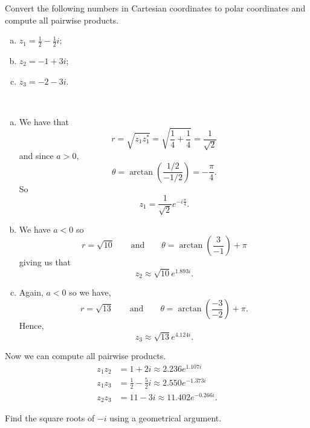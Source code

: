 \documentclass[12pt]{article} %
\begin{document}
\begin{problem}
Convert the following numbers in Cartesian coordinates to polar coordinates and compute all pairwise products.
\begin{enumerate}[(a)]
    \item $z_1=\frac{1}{2}-\frac{1}{2}i$;
    \item $z_2=-1+3i$;
    \item $z_3=-2-3i$.
\end{enumerate}
\end{problem}

\begin{solution}~
\begin{enumerate}[(a)]
    \item We have that
    \[
    r=\sqrt{z_1z_1^*}=\sqrt{\frac{1}{4}+\frac{1}{4}}=\frac{1}{\sqrt{2}}
    \]
    and since $a>0$, 
    \[
    \theta = \arctan\left( \frac{1/2}{-1/2}\right)=-\frac{\pi}{4}.
    \]
    So
    \[
    z_1 = \frac{1}{\sqrt{2}} e^{-i\frac{\pi}{4}}.
    \]
    \item We have $a<0$ so
    \[
    r=\sqrt{10} \qquad \textrm{and} \qquad \theta = \arctan\left( \frac{3}{-1}\right)+\pi
    \]
    giving us that
    \[
    z_2 \approx \sqrt{10}e^{1.893i}.
    \]
    \item Again, $a<0$ so we have,
    \[
    r=\sqrt{13} \qquad \textrm{and} \qquad \theta = \arctan \left(\frac{-3}{-2}\right)+\pi.
    \]
    Hence,
    \[
    z_3 \approx \sqrt{13}e^{4.124i}.
    \]
\end{enumerate}
Now we can compute all pairwise products.
\begin{align*}
    z_1 z_2 &= 1+2i\approx 2.236e^{1.107i}\\
    z_1 z_3 &= \frac{1}{2}-\frac{5}{2}i\approx 2.550e^{-1.373i}\\
    z_2 z_3 &= 11-3i\approx 11.402e^{-0.266i}.
\end{align*}

\end{solution}

\newpage

\begin{problem}
Find the square roots of $-i$ using a geometrical argument.
\end{problem}
\end{document}
